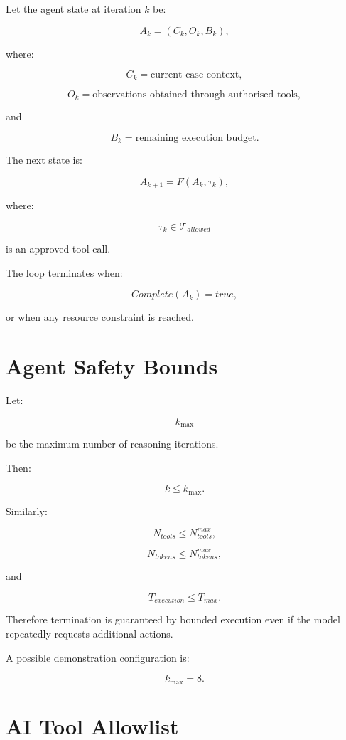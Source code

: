 \documentclass[11pt,a4paper]{article}
\begin{document}
Let the agent state at iteration \(k\) be:

\[
A_k
=
(C_k,O_k,B_k),
\]

where:

\[
C_k = \text{current case context},
\]

\[
O_k = \text{observations obtained through authorised tools},
\]

and

\[
B_k = \text{remaining execution budget}.
\]

The next state is:

\[
A_{k+1}
=
F(A_k,\tau_k),
\]

where:

\[
\tau_k
\in
\mathcal{T}_{allowed}
\]

is an approved tool call.

The loop terminates when:

\[
Complete(A_k)=true,
\]

or when any resource constraint is reached.

\section{Agent Safety Bounds}

Let:

\[
k_{\max}
\]

be the maximum number of reasoning iterations.

Then:

\[
k\leq k_{\max}.
\]

Similarly:

\[
N_{tools}\leq N_{tools}^{max},
\]

\[
N_{tokens}\leq N_{tokens}^{max},
\]

and

\[
T_{execution}\leq T_{max}.
\]

Therefore termination is guaranteed by bounded execution even if the
model repeatedly requests additional actions.

A possible demonstration configuration is:

\[
k_{\max}=8.
\]

\section{AI Tool Allowlist}
\end{document}
